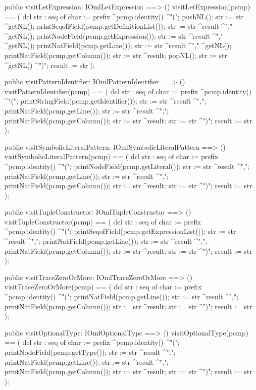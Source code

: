 \begin{vdm_al}
  public visitLetExpression: IOmlLetExpression ==> ()
  visitLetExpression(pcmp) ==
    ( dcl str : seq of char := prefix ^pcmp.identity() ^"(";
      pushNL();
      str := str ^getNL();
      printSeqofField(pcmp.getDefinitionList());
      str := str ^result ^"," ^getNL();
      printNodeField(pcmp.getExpression());
      str := str ^result ^"," ^getNL();
      printNatField(pcmp.getLine());
      str := str ^result ^"," ^getNL();
      printNatField(pcmp.getColumn());
      str := str ^result;
      popNL();
      str := str ^getNL() ^")";
      result := str );

  public visitPatternIdentifier: IOmlPatternIdentifier ==> ()
  visitPatternIdentifier(pcmp) ==
    ( dcl str : seq of char := prefix ^pcmp.identity() ^"(";
      printStringField(pcmp.getIdentifier());
      str := str ^result ^",";
      printNatField(pcmp.getLine());
      str := str ^result ^",";
      printNatField(pcmp.getColumn());
      str := str ^result;
      str := str ^")";
      result := str );

  public visitSymbolicLiteralPattern: IOmlSymbolicLiteralPattern ==> ()
  visitSymbolicLiteralPattern(pcmp) ==
    ( dcl str : seq of char := prefix ^pcmp.identity() ^"(";
      printNodeField(pcmp.getLiteral());
      str := str ^result ^",";
      printNatField(pcmp.getLine());
      str := str ^result ^",";
      printNatField(pcmp.getColumn());
      str := str ^result;
      str := str ^")";
      result := str );

  public visitTupleConstructor: IOmlTupleConstructor ==> ()
  visitTupleConstructor(pcmp) ==
    ( dcl str : seq of char := prefix ^pcmp.identity() ^"(";
      printSeqofField(pcmp.getExpressionList());
      str := str ^result ^",";
      printNatField(pcmp.getLine());
      str := str ^result ^",";
      printNatField(pcmp.getColumn());
      str := str ^result;
      str := str ^")";
      result := str );

  public visitTraceZeroOrMore: IOmlTraceZeroOrMore ==> ()
  visitTraceZeroOrMore(pcmp) ==
    ( dcl str : seq of char := prefix ^pcmp.identity() ^"(";
      printNatField(pcmp.getLine());
      str := str ^result ^",";
      printNatField(pcmp.getColumn());
      str := str ^result;
      str := str ^")";
      result := str );

  public visitOptionalType: IOmlOptionalType ==> ()
  visitOptionalType(pcmp) ==
    ( dcl str : seq of char := prefix ^pcmp.identity() ^"(";
      printNodeField(pcmp.getType());
      str := str ^result ^",";
      printNatField(pcmp.getLine());
      str := str ^result ^",";
      printNatField(pcmp.getColumn());
      str := str ^result;
      str := str ^")";
      result := str );


\end{vdm_al}
